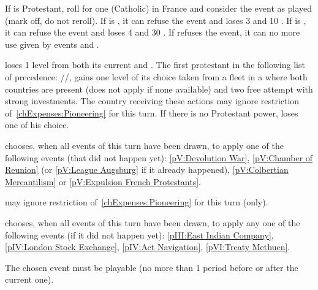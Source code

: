 

\condition{}
\aparag If \FRA is Protestant, roll for one (Catholic) \REVOLT in France and
consider the event as played (mark off, do not reroll).
\aparag If \FRA is \CATHCO, it can refuse the event and loses 3 \STAB and 10
\PV.
\aparag If \FRA is \CATHCR, it can refuse the event and loses 4 \STAB and 30
\PV.
\aparag If \FRA refuses the event, it can no more use \CB given by events
 and .

\phevnt
\aparag \FRA loses 1 level from both its current \FTI and \DTI.
\aparag The first protestant in the following list of precedence:
\HOL/\ENG/\SUE, gains one \TradeFLEET level of its choice taken from a
\TradeFLEET fleet in a \STZ where both countries are present (does not apply
if none available) and two free \COL attempt with strong investments.
\bparag The country receiving these actions may ignore restriction
of~\ref{chExpenses:Pioneering} for this turn.
\bparag If there is no Protestant power, \FRA loses one \TradeFLEET of his
choice.





\phevnt
\aparag \FRA chooses, when all events of this turn have been drawn, to apply
one of the following events (that did not happen yet): \ref{pV:Devolution
  War}, \ref{pV:Chamber of Reunion} (or \ref{pV:League Augsburg} if it already
happened), \ref{pV:Colbertian Mercantilism} or \ref{pV:Expulsion French
  Protestants}.

\phadm
\aparag \FRA may ignore restriction of~\ref{chExpenses:Pioneering} for this
turn (only).




\history{}

\phevnt
\aparag \ENG chooses, when all events of this turn have been drawn, to apply
any one of the following events (if it did not happen yet): \ref{pIII:East
  Indian Company}, \ref{pIV:London Stock Exchange}, \ref{pIV:Act Navigation},
\ref{pVI:Treaty Methuen}.

\bparag The chosen event must be playable (no more than 1 period before or
after the current one).

